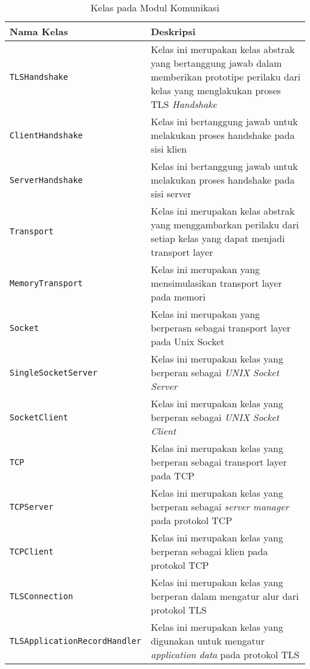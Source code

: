 \begin{longtable}{|p{3.75cm}|p{9cm}|}
  \caption{Kelas pada Modul Komunikasi} \label{tab:impl.comm} \\

  \hline
    Nama Kelas & Deskripsi \\ \hline
    \endhead

    \texttt{TLSHandshake} & Kelas ini merupakan kelas abstrak yang bertanggung jawab dalam memberikan prototipe perilaku dari kelas yang menglakukan proses TLS \emph{Handshake}\\ \hline
    \texttt{ClientHandshake} & Kelas ini bertanggung jawab untuk melakukan proses handshake pada sisi klien\\ \hline
    \texttt{ServerHandshake} & Kelas ini bertanggung jawab untuk melakukan proses handshake pada sisi server\\ \hline
    \texttt{Transport} & Kelas ini merupakan kelas abstrak yang menggambarkan perilaku dari setiap kelas yang dapat menjadi transport layer\\ \hline
    \texttt{MemoryTransport} & Kelas ini merupakan yang mensimulasikan transport layer pada memori\\ \hline
    \texttt{Socket} & Kelas ini merupakan yang berperasn sebagai transport layer pada Unix Socket\\ \hline
    \texttt{SingleSocketServer} & Kelas ini merupakan kelas yang berperan sebagai \emph{UNIX Socket Server}\\ \hline
    \texttt{SocketClient} & Kelas ini merupakan kelas yang berperan sebagai \emph{UNIX Socket Client}\\ \hline
    \texttt{TCP} & Kelas ini merupakan kelas yang berperan sebagai transport layer pada TCP\\ \hline
    \texttt{TCPServer} & Kelas ini merupakan kelas yang berperan sebagai \emph{server manager} pada protokol TCP\\ \hline
    \texttt{TCPClient} & Kelas ini merupakan kelas yang berperan sebagai klien pada protokol TCP\\ \hline
    \texttt{TLSConnection} & Kelas ini merupakan kelas yang berperan dalam mengatur alur dari protokol TLS\\ \hline
    \texttt{TLSApplicationRecordHandler} & Kelas ini merupakan kelas yang digunakan untuk mengatur \emph{application data} pada protokol TLS\\ \hline
\end{longtable}
  


